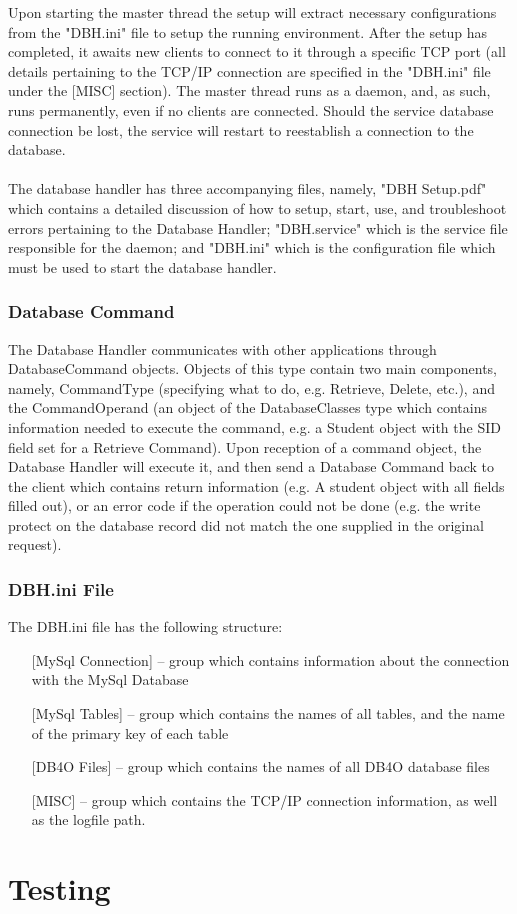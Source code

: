 \documentclass[letterpaper]{report}
\begin{document}
	Upon starting the master thread the setup will extract necessary configurations from the "DBH.ini" file to setup the running environment. After the setup has completed, it awaits new clients to connect to it through a specific TCP port (all details pertaining to the TCP/IP connection are specified in the "DBH.ini" file under the [MISC] section). The master thread runs as a daemon, and, as such, runs permanently, even if no clients are connected. Should the service database connection be lost, the service will restart to reestablish a connection to the database. \\ \\ The database handler has three accompanying files, namely, "DBH Setup.pdf" which contains a detailed discussion of how to setup, start, use, and troubleshoot errors pertaining to the Database Handler; "DBH.service" which is the service file responsible for the daemon; and "DBH.ini" which is the configuration file which must be used to start the database handler.
	\subsection{Database Command}
	The Database Handler communicates with other applications through DatabaseCommand objects. Objects of this type contain two main components, namely, CommandType (specifying what to do, e.g. Retrieve, Delete, etc.), and the CommandOperand (an object of the DatabaseClasses type which contains information needed to execute the command, e.g. a Student object with the SID field set for a Retrieve Command). Upon reception of a command object, the Database Handler will execute it, and then send a Database Command back to the client which contains return information (e.g. A student object with all fields filled out), or an error code if the operation could not be done (e.g. the write protect on the database record did not match the one supplied in the original request).
	\subsection{DBH.ini File}
	The DBH.ini file has the following structure:
	\begin{enumerate}
		\item [] [MySql Connection] -- group which contains information about the connection with the MySql Database
		\item [] [MySql Tables] -- group which contains the names of all tables, and the name of the primary key of each table
		\item [] [DB4O Files] -- group which contains the names of all DB4O database files
		\item [] [MISC] -- group which contains the TCP/IP connection information, as well as the logfile path.
	\end{enumerate}
	\chapter{Testing}
	
\end{document}
